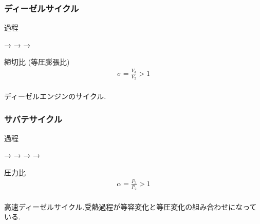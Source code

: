\documentclass[a4paper]{jsarticle}
\begin{document}
\subsubsection{ディーゼルサイクル}
\begin{itembox}[l]{過程}
    \begin{center}
        \quad → \quad {} \quad → \quad {} \quad → \quad {}
    \end{center}
\end{itembox}
\begin{itembox}[l]{締切比 (等圧膨張比)}
    \begin{eqnarray*}
        \sigma=\frac{V_3}{V_2}>1\\
    \end{eqnarray*}
\end{itembox}
ディーゼルエンジンのサイクル.
\subsubsection{サバテサイクル}
\begin{itembox}[l]{過程}
    \begin{center}
        \quad → \quad {}\quad → \quad {} \quad → \quad {} \quad → \quad {}
    \end{center}
\end{itembox}
\begin{itembox}[l]{圧力比}
    \begin{eqnarray*}
        \alpha=\frac{P_3}{P_2}>1\\
    \end{eqnarray*}
\end{itembox}
高速ディーゼルサイクル.受熱過程が等容変化と等圧変化の組み合わせになっている.
\end{document}

